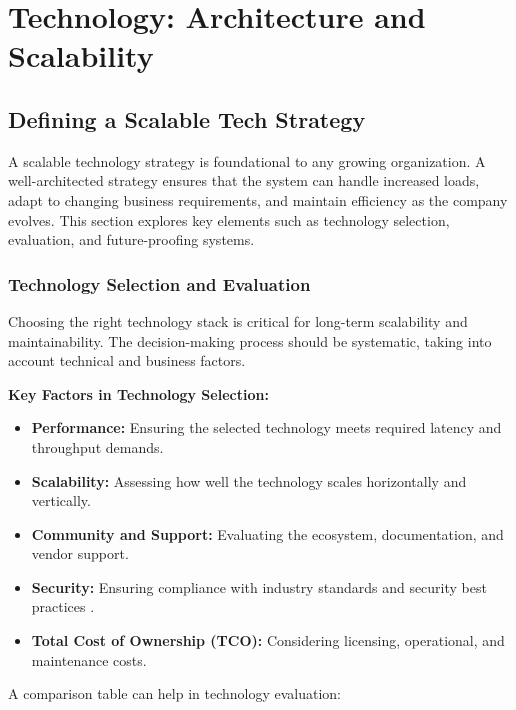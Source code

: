 \chapter{Technology: Architecture and Scalability}

\section{Defining a Scalable Tech Strategy}

A scalable technology strategy is foundational to any growing organization. A well-architected strategy ensures that the system can handle increased loads, adapt to changing business requirements, and maintain efficiency as the company evolves. This section explores key elements such as technology selection, evaluation, and future-proofing systems.

\subsection{Technology Selection and Evaluation}

Choosing the right technology stack is critical for long-term scalability and maintainability. The decision-making process should be systematic, taking into account technical and business factors.

\textbf{Key Factors in Technology Selection:}
\begin{itemize}
    \item \textbf{Performance:} Ensuring the selected technology meets required latency and throughput demands.
    \item \textbf{Scalability:} Assessing how well the technology scales horizontally and vertically.
    \item \textbf{Community and Support:} Evaluating the ecosystem, documentation, and vendor support.
    \item \textbf{Security:} Ensuring compliance with industry standards and security best practices .
    \item \textbf{Total Cost of Ownership (TCO):} Considering licensing, operational, and maintenance costs.
\end{itemize}

A comparison table can help in technology evaluation:

